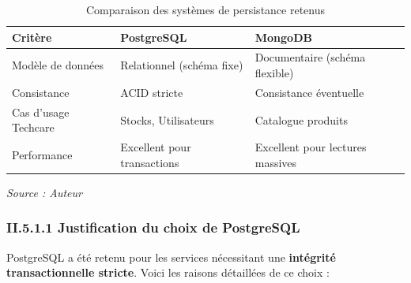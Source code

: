 \begin{table}[htbp]
    \centering
    \begin{tabular}{|p{4cm}|p{5cm}|p{5cm}|}
        \hline
        \textbf{Critère} & \textbf{PostgreSQL} & \textbf{MongoDB} \\
        \hline
        Modèle de données & Relationnel (schéma fixe) & Documentaire (schéma flexible) \\
        \hline
        Consistance & ACID stricte & Consistance éventuelle \\
        \hline
        Cas d'usage Techcare & Stocks, Utilisateurs & Catalogue produits \\
        \hline
        Performance & Excellent pour transactions & Excellent pour lectures massives \\
        \hline
    \end{tabular}
    \caption{Comparaison des systèmes de persistance retenus}
    \vspace{0.2cm}\small\textit{Source : Auteur}
    \label{tab:db_comparison}
\end{table}

\subsubsection{II.5.1.1 Justification du choix de PostgreSQL}

PostgreSQL a été retenu pour les services nécessitant une \textbf{intégrité transactionnelle stricte}. Voici les raisons détaillées de ce choix :

